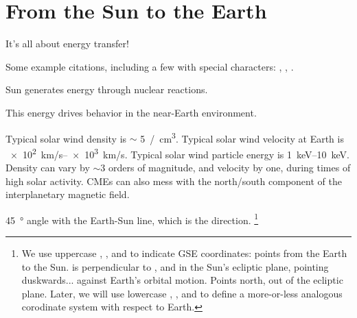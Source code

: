 
\chapter{From the Sun to the Earth}
\label{ch_intro}

It's all about energy transfer! 

Some example citations, including a few with special characters: \cite{dai_2013}, \cite{dai_2015}, \cite{lysak_2001}. 





Sun generates energy through nuclear reactions. 

This energy drives behavior in the near-Earth environment. 

Typical solar wind density is $\sim$ \SI{5}{/\cm\cubed}. Typical solar wind velocity at Earth is \SIrange{e2}{e3}{\km/\s}. Typical solar wind particle energy is \SIrange{1}{10}{\kilo\eV}. Density can vary by $\sim$3 orders of magnitude, and velocity by one, during times of high solar activity. CMEs can also mess with the north/south component of the interplanetary magnetic field. 

\SI{45}{\degree} angle with the Earth-Sun line, which is the \X direction. 
\footnote{We use uppercase \X, \Y, and \Z to indicate GSE coordinates: \X points from the Earth to the Sun. \Y is perpendicular to \X, and in the Sun's ecliptic plane, pointing duskwards... against Earth's orbital motion. Points north, out of the ecliptic plane. Later, we will use lowercase \x, \y, and \z to define a more-or-less analogous corodinate system with respect to Earth.}

